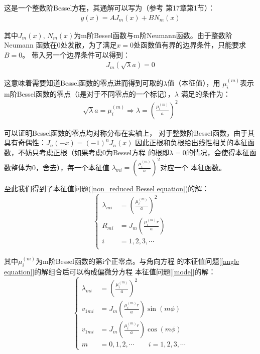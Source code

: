 \documentclass[a4paper]{ctexart}
\begin{document}
	\par 
	这是一个整数阶Bessel方程，其通解可以写为（参考\cite{mathematicalmethod}
	第17章第1节）：
	\begin{align}
		y(x) = AJ_{m}(x) + BN_{m}(x)
	\end{align}
	\par 其中$J_{m}(x),\,N_{m}(x)$为m阶Bessel函数与m阶Neumann函数。由于整数阶Neumann
	函数在0处发散，为了满足$x=0$处函数值有界的边界条件，只能要求$B=0$。
	带入另一个边界条件可以得到：
	\begin{align}
		J_{m}(\sqrt{\lambda}a) = 0
	\end{align}
	\par 这意味着需要知道Bessel函数的零点进而得到可取的$\lambda$值（本征值），用
	$\mu_{i}^{(m)}$表示m阶Bessel函数的零点（i是对于不同零点的一个标记），$\lambda$
	满足的条件为：
	\begin{align}
		\sqrt{\lambda} a = \mu_{i}^{(m)}
		\Rightarrow \lambda = \left(\frac{\mu_{i}^{(m)}}{a}\right)^2 
	\end{align}
	\par 可以证明Bessel函数的零点均对称分布在实轴上\cite{specialfunction}，
	对于整数阶Bessel函数，由于其具有奇偶性\cite{mathematicalmethod}：$J_n(-x) = (-1)^n J_n(x)$
	因此正根和负根给出线性相关的本征函数，不妨只考虑正根（如果考虑0为Bessel方程
	的根即$\lambda = 0$的情况，会使得本征函数整体为0，舍去），每一个本征值
	$\lambda_{mi} = \left(\frac{\mu_{i}^{(m)}}{a}\right)^2$对应一个
	本征函数。
	\par
	至此我们得到了本征值问题(\ref{non_reduced Bessel equation})的解：
	\begin{equation}
		\left\{ 
		\begin{split}
			\lambda_{mi} &= \left(\frac{\mu_{i}^{(m)}}{a}\right)^2\\
			R_{mi} &= J_{m}\left(\frac{\mu_{i}^{(m)}r}{a}\right)\\
			i &= 1, 2, 3,\cdots\\
		\end{split}
		\right.
	\end{equation}
	\par  其中$\mu_{i}^{(m)}$为m阶Bessel函数的第i个正零点。与角向方程
	的本征值问题[\ref{angle equation}]的解组合后可以构成偏微分方程
	本征值问题[\ref{mode}]的解：
	\begin{equation}
		\left\{
		\begin{split}
			\lambda_{mi} &= \left(\frac{\mu_{i}^{(m)}}{a}\right)^2\\
			v_{1mi} &= J_m\left(\frac{\mu_{i}^{(m)}r}{a}\right)\sin(m\phi)\\
			v_{1mi} &= J_m\left(\frac{\mu_{i}^{(m)}r}{a}\right)\cos(m\phi)\\
			m &= 0,1,2,\cdots\quad \quad i = 1, 2, 3,\cdots
		\end{split}
		\right.
	\end{equation}
\end{document}
